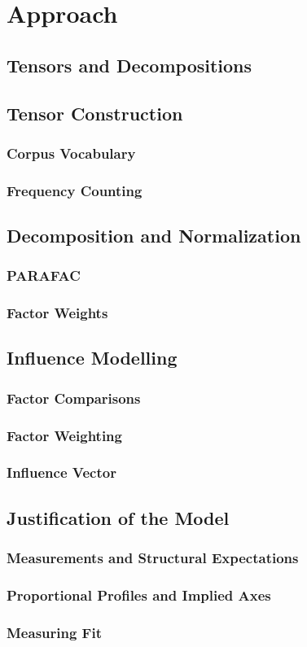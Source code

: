 \documentclass[../dissertation.tex]{subfiles}
\begin{document}
\chapter{Approach}

\section{Tensors and Decompositions}

\section{Tensor Construction}
\subsection{Corpus Vocabulary}
\subsection{Frequency Counting}

\section{Decomposition and Normalization}
\subsection{PARAFAC}
\subsection{Factor Weights}

\section{Influence Modelling}
\subsection{Factor Comparisons}
\subsection{Factor Weighting}
\subsection{Influence Vector}

\section{Justification of the Model}
\subsection{Measurements and Structural Expectations}
\subsection{Proportional Profiles and Implied Axes}
\subsection{Measuring Fit}
\end{document}
